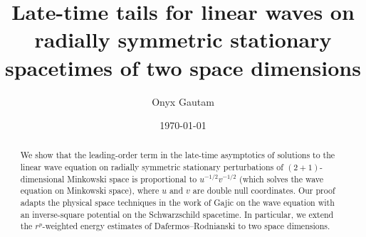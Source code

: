 \documentclass[10pt, reqno]{amsart}
\author{Onyx Gautam}
\date{\today}
\title{Late-time tails for linear waves on radially symmetric stationary spacetimes of two space dimensions}
\begin{document}
\maketitle
\vspace{-4ex}
\begin{abstract}
We show that the leading-order term in the late-time asymptotics of solutions to
the linear wave equation on radially symmetric stationary perturbations of
\((2 + 1)\)-dimensional Minkowski space is proportional to \(u^{-1/2}v^{-1/2}\)
(which solves the wave equation on Minkowski space), where \(u\) and \(v\) are
double null coordinates. Our proof adapts the physical space techniques in the
work of Gajic \cite{GAJIC2023110058} on the wave equation with an inverse-square
potential on the Schwarzschild spacetime. In particular, we extend
the \(r^p\)-weighted energy estimates of Dafermos--Rodnianski \cite{rp-method} to
two space dimensions.
\end{abstract}
\setcounter{tocdepth}{2}
\tableofcontents
\newpage
\end{document}
